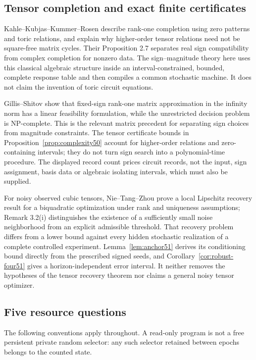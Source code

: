 \subsection{Tensor completion and exact finite certificates}
Kahle--Kubjas--Kummer--Rosen \cite[Proposition 2.2 and Remarks 2.3,
2.5]{KKKR} describe rank-one completion using zero patterns and toric
relations, and explain why higher-order tensor relations need not be
square-free matrix cycles. Their Proposition 2.7 separates real sign
compatibility from complex completion for nonzero data. The
sign--magnitude theory here uses this classical algebraic structure
inside an interval-constrained, bounded, complete response table and
then compiles a common stochastic machine. It does not claim the
invention of toric circuit equations.

Gillis--Shitov \cite[Lemma 1 and Theorem 3]{GS} show that fixed-sign
rank-one matrix approximation in the infinity norm has a linear
feasibility formulation, while the unrestricted decision problem is
NP-complete. This is the relevant matrix precedent for separating
sign choices from magnitude constraints. The tensor certificate
bounds in Proposition~\ref{prop:complexity50} account for higher-order
relations and zero-containing intervals; they do not turn sign
search into a polynomial-time procedure. The displayed record count
prices circuit records, not the input, sign assignment, basis data or
algebraic isolating intervals, which must also be supplied.

For noisy observed cubic tensors, Nie--Tang--Zhou
\cite[Theorem 3.1]{NTZ26} prove a local Lipschitz recovery result for
a biquadratic optimization under rank and uniqueness assumptions;
Remark 3.2(i) distinguishes the existence of a sufficiently small
noise neighborhood from an explicit admissible threshold. That
recovery problem differs from a lower bound against every hidden
stochastic realization of a complete controlled experiment.
Lemma~\ref{lem:anchor51} derives its conditioning bound directly
from the prescribed signed seeds, and
Corollary~\ref{cor:robust-four51} gives a horizon-independent error
interval. It neither removes the hypotheses of the tensor recovery
theorem nor claims a general noisy tensor optimizer.

\subsection{Five resource questions}
The following conventions apply throughout. A read-only program is
not a free persistent private random selector: any such selector
retained between epochs belongs to the counted state.

